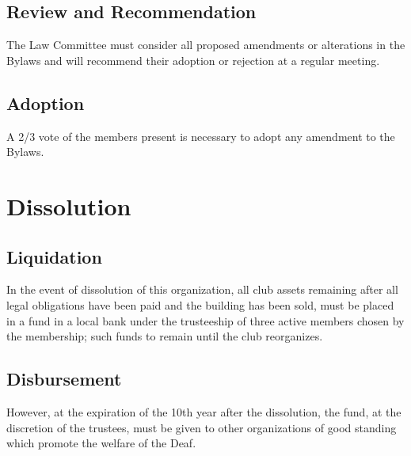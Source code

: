 \documentclass[12pt,letterpaper]{article}
\begin{document}
\subsection{Review and Recommendation}
The Law Committee must consider all proposed amendments or alterations in the Bylaws and will recommend their adoption or rejection at a regular meeting. 

\subsection{Adoption}
A 2/3 vote of the members present is necessary to adopt any amendment to the Bylaws.

\section{Dissolution}

\subsection{Liquidation}
In the event of dissolution of this organization, all club assets remaining after all legal obligations have been paid and the building has been sold, must be placed in a fund in a local bank under the trusteeship of three active members chosen by the membership; such funds to remain until the club reorganizes. 

\subsection{Disbursement}
However, at the expiration of the 10th year after the dissolution, the fund, at the discretion of the trustees, must be given to other organizations of good standing which promote the welfare of the Deaf. 
\end{document}
